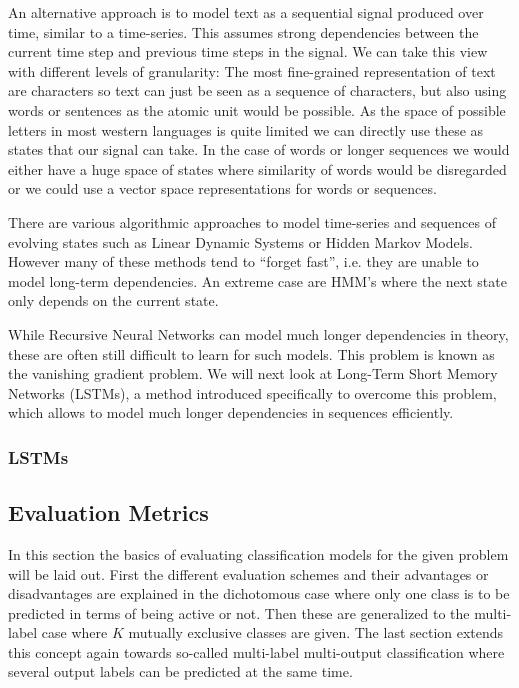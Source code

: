 An alternative approach is to model text as a sequential signal produced over time, similar to a time-series. This assumes strong dependencies between the current time step and previous time steps in the signal.
We can take this view with different levels of granularity: The most fine-grained representation of text are characters so text can just be seen as a sequence of characters, but also using words or sentences as the atomic unit would be possible. As the space of possible letters in most western languages is quite limited we can directly use these as states that our signal can take. In the case of words or longer sequences we would either have a huge space of states where similarity of words would be disregarded or we could use a vector space representations for words or sequences.

There are various algorithmic approaches to model time-series and sequences of evolving states such as Linear Dynamic Systems or Hidden Markov Models. However many of these methods tend to ``forget fast'', i.e. they are unable to model long-term dependencies. An extreme case are HMM's where the next state only depends on the current state.

While Recursive Neural Networks can model much longer dependencies in theory, these are often still difficult to learn for such models. This problem is known as the vanishing gradient problem. We will next look at Long-Term Short Memory Networks (LSTMs), a method introduced specifically to overcome this problem, which allows to model much longer dependencies in sequences efficiently.

\subsubsection{LSTMs}
\label{subs:LSTMs}










\subsection{Evaluation Metrics}
\label{sub:Evaluation Metrics}

In this section the basics of evaluating classification models for the given problem will be laid out. First the different evaluation schemes and their advantages or disadvantages are explained in the dichotomous case where only one class is to be predicted in terms of being active or not. Then these are generalized to the multi-label case where $K$ mutually exclusive classes are given. The last section extends this concept again towards so-called multi-label multi-output classification where several output labels can be predicted at the same time.

